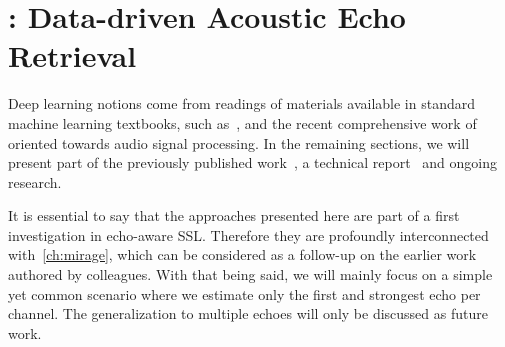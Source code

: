 \chapter{: Data-driven Acoustic Echo Retrieval}\label{ch:lantern}

 \synopsisChLantern

\mynewline
Deep learning notions come from readings of materials available in standard machine learning textbooks, such as~, and the recent comprehensive work of~ oriented towards audio signal processing.
In the remaining sections, we will present part of the previously published work~\cite{di2019mirage}, a technical report~\cite{di2019honda} and ongoing research.

\mynewline
It is essential to say that the approaches presented here are part of a first investigation in echo-aware \ac{SSL}.
Therefore they are profoundly interconnected with~\cref{ch:mirage}, which can be considered as a follow-up on the earlier work~ authored by colleagues.
With that being said, we will mainly focus on a simple yet common scenario where we estimate only the first and strongest echo per channel.
The generalization to multiple echoes will only be discussed as future work.

